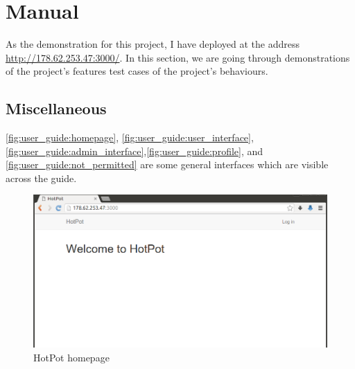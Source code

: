 
\section{Manual}
\label{ch:appendix-a:user_guide}

As the demonstration for this project, I have deployed \myProject at the address \href{http://178.62.253.47:3000/}{http://178.62.253.47:3000/}.
In this section, we are going through demonstrations of the project's features \ie test cases of the project's behaviours.

\subsection{Miscellaneous}
\label{ch:appendix-a:user_guide:miscellaneous}
\autoref{fig:user_guide:homepage}, \autoref{fig:user_guide:user_interface}, \autoref{fig:user_guide:admin_interface},\autoref{fig:user_guide:profile}, and \autoref{fig:user_guide:not_permitted} are some general interfaces which are visible across the guide.

\begin{figure}[bth]                                                                                                                                                  \myfloatalign
\includegraphics[width=1.0\linewidth]{gfx/chapter_5/general/homepage}
\caption[HotPot homepage]{HotPot homepage}
\label{fig:user_guide:homepage}
\end{figure}

